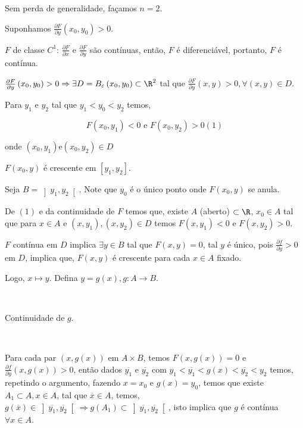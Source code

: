 \documentclass[11pt, oneside, a4paper]{gsm-l}
\begin{document}
\begin{dem}
Sem perda de generalidade, façamos $n = 2$.

Suponhamos $\frac{{\partial F}}{{\partial y}}\left( {x_0 ,y_0 } \right) > 0$.

    $F$ de classe $C^1$: $\frac{{\partial F}}{{\partial x}}$ e $\frac{{\partial F}}{{\partial y}}$ são contínuas, então, $F$ é diferenciável, portanto, $F$ é contínua.

$\frac{{\partial F}}
{{\partial y}}\left( {x_0 ,y_0 } \right) > 0 \Rightarrow \exists D = B_\varepsilon  \left( {x_0 ,y_0 } \right) \subset \R^2$ tal que $\frac{{\partial F}}
{{\partial y}}\left( {x,y} \right) > 0,\forall \left( {x,y} \right) \in D$.

Para $y_1$ e $y_2$ tal que $y_1 < y_0 < y_2$ temos,

\[
F\left( {x_0 ,y_1 } \right) < 0{\text{ e }}F\left( {x_0 ,y_2 } \right) > 0\left( 1 \right)
\]

onde $\left( {x_0 ,y_1 } \right){\text{e}}\left( {x_0 ,y_2 } \right) \in D$

$F\left( {x_0 ,y} \right)$ é crescente em $\left[ {y_1 ,y_2 } \right]$.

Seja $B = \left] {y_1 ,y_2 } \right[$. Note que $y_0$ é o \'unico ponto onde $F\left( {x_0 ,y} \right)$ se anula.

De $(1)$ e da continuidade de $F$ temos que, existe $A$ (aberto) $\subset \R$, $x_0 \in A$ tal que para $x \in A$ e $\left( {x,y_1 } \right),\left( {x,y_2 } \right) \in D$ temos $F\left( {x,y_1 } \right) < 0$ e $F\left( {x,y_2 } \right) > 0$.

$F$ contínua em $D$ implica $\exists y \in B$ tal que $F\left( {x,y} \right) = 0$, tal $y$ é \'unico, pois $\frac{{\partial f}}
{{\partial y}} > 0$ em $D$, implica que, $F\left( {x,y} \right)$ é crescente para cada $x \in A$ fixado.

Logo, $x \mapsto y$. Defina $y = g\left( x \right),g:A \to B$.

\

Continuidade de $g$.

\

Para cada par $\left( {x,g\left( x \right)} \right)$ em $A \times B$, temos $F\left( {x,g\left( x \right)} \right) = 0$ e $\frac{{\partial f}}
{{\partial y}}\left( {x,g\left( x \right)} \right) > 0$, então dados $\overline {y_1}$ e $\overline {y_2}$ com $y_1  < \overline {y_1 }  < g\left( x \right) < \overline {y_2 }  < y_2$ temos, repetindo o argumento, fazendo $x = x_0$ e $g(x) = y_0$, temos que existe $A_1 \subset A, x \in A$, tal que $\overline x  \in A$, temos, $g\left( {\overline x } \right) \in \left] {\overline {y_1 } ,\overline {y_2 } } \right[ \Rightarrow g\left( {A_1 } \right) \subset \left] {\overline {y_1 } ,\overline {y_2 } } \right[$, isto implica que $g$ é contínua $\forall x \in A$.


\end{dem}
\end{document}

